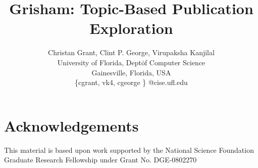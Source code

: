 \documentclass{sig-alternate}
\newcommand{\system}{Grisham\xspace}
\begin{document}
\title{\system: Topic-Based Publication Exploration}

\author{Christan Grant, Clint P. George, Virupaksha Kanjilal \\
				University of Florida, Dept\. of Computer Science \\
				Gainesville, Florida, USA \\
				\{cgrant, vk4, cgeorge \} @cise.ufl.edu
}

\maketitle










\section{Acknowledgements}
This material is based upon work supported by the National Science Foundation 
Graduate Research Fellowship under Grant No. DGE-0802270



\begin{small}

\end{small}
\end{document}

